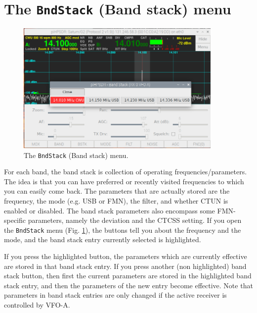 \documentclass[12pt]{book}
\def\bltt#1{\texttt{\color{blue}#1}}
\begin{document}
\section{The  \texttt{BndStack} (Band stack) menu}

\begin{figure}[ht!]
\center
\includegraphics[width=10cm]{BandstackMenu.png}
\caption{The \bltt{BndStack} (Band stack) menu.}
\label{fig:BandstackMenu}
\end{figure}

For each band, the band stack is collection of operating frequencies/parameters. The idea is that
you can have preferred or recently visited frequencies to which you can easily come back.
The parameters that are actually stored are the frequency, the mode (e.g. USB or FMN),
the filter, and whether CTUN is enabled or disabled. The band stack parameters
also encompass some FMN-specific parameters,  namely the deviation and
the  CTCSS setting.
If you open the \bltt{BndStack} menu (Fig. \ref{fig:BandstackMenu}), the buttons
tell you about the frequency and the mode, and the band stack entry currently selected is highlighted.

If you press the highlighted button, the parameters which are currently effective are stored in that band stack
entry. If you press another (non highlighted) band stack button, then first the current
parameters are stored in the highlighted band stack entry, and then the parameters of the
new entry become effective. Note that parameters in band stack entries are only changed if the active
receiver is controlled by VFO-A.

\end{document}
